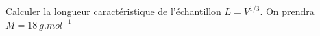 




\begin{enonce}
Calculer la longueur caractéristique de l'échantillon $L=V^{1/3}$. On prendra $M=\SI{18}{g.mol^{-1}}$
\end{enonce}





\finEntrainement





\newpage








\hauteurLargeurCadreReponse		{8mm}{7cm}
\typeEntrainement				{} %
\initialisationEntrainement

